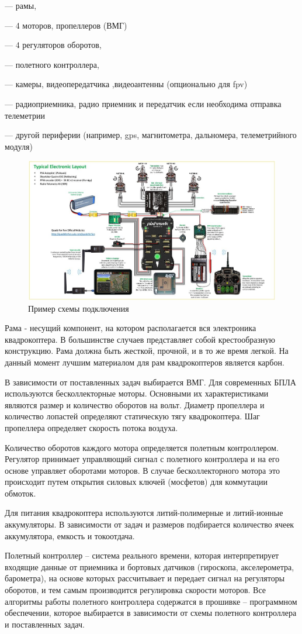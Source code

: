 --- рамы,

--- 4 моторов, пропеллеров (ВМГ)

--- 4 регуляторов оборотов,

--- полетного контроллера,

--- камеры, видеопередатчика ,видеоантенны (опционально для fpv)

--- радиоприемника, радио приемник и передатчик если необходима отправка телеметрии

--- другой периферии (например, gps, магнитометра, дальномера, телеметрийного модуля)

 \begin{figure}[H]
 	\centering
 	\includegraphics[width=0.5\linewidth]{pics/pix}
 	\caption{Пример схемы подключения
 	}
 	\label{fig:pix}
 \end{figure}
Рама - несущий компонент, на котором располагается вся электроника квадрокоптера. В большинстве случаев представляет собой крестообразную конструкцию. Рама должна быть жесткой, прочной, и в то же время легкой. На данный момент лучшим материалом для рам квадрокоптеров является карбон.

В зависимости от поставленных задач выбирается ВМГ. Для современных БПЛА используются бесколлекторные моторы. Основными их характеристиками являются размер и количество оборотов на вольт. 
Диаметр пропеллера и количество лопастей определяют статическую тягу квадрокоптера. Шаг пропеллера определяет скорость потока воздуха.

Количество оборотов каждого мотора определяется полетным контроллером. Регулятор принимает управляющий сигнал с полетного контроллера и на его основе управляет оборотами моторов. В случае бесколлекторного мотора это происходит путем открытия силовых ключей (мосфетов) для коммутации обмоток.

Для питания квадрокоптера используются литий-полимерные и литий-ионные аккумуляторы. В зависимости от задач и размеров подбирается количество ячеек аккумулятора, емкость и токоотдача.

Полетный контроллер -- система реального времени, которая интерпретирует входящие данные от приемника и бортовых датчиков (гироскопа, акселерометра, барометра), на основе которых рассчитывает и передает сигнал на регуляторы оборотов, и тем самым производится регулировка скорости моторов. Все алгоритмы работы полетного контроллера содержатся в прошивке -- программном обеспечении, которое выбирается в зависимости от схемы полетного контроллера и поставленных задач.

